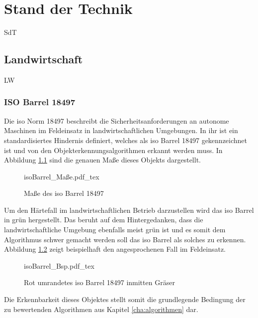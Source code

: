 \documentclass[12pt,
titlepage,
a4paper,
oneside,     %
openany,     %
listof=totoc,  %
numbers = noenddot, %
bibliography=totoc,    %
headsepline, %
]{scrbook} %
\begin{document}
\chapter{Stand der Technik}
\label{cha:sdT}

SdT

\section{Landwirtschaft}
\label{sec_landwirtschaft}

LW

\subsection{ISO Barrel 18497}
\label{subsec_iso}

Die \ac{iso} Norm 18497 beschreibt die Sicherheitsanforderungen an autonome Maschinen im Feldeinsatz in landwirtschaftlichen Umgebungen. In ihr ist ein standardisiertes Hindernis definiert, welches als \ac{iso} Barrel 18497 gekennzeichnet ist und von den Objekterkennungsalgorithmen erkannt werden muss. In Abbildung \ref{fig:isoBarrel} sind die genauen Maße dieses Objekts dargestellt. \\

\begin{figure}[h]
	\centering
	\def\svgwidth{0.6\columnwidth}
	{isoBarrel_Maße.pdf_tex}
	\caption{Maße des \ac{iso} Barrel 18497}
	\label{fig:isoBarrel}
\end{figure}

Um den Härtefall im landwirtschaftlichen Betrieb darzustellen wird das \ac{iso} Barrel in grün hergestellt. Das beruht auf dem Hintergedanken, dass die landwirtschaftliche Umgebung ebenfalls meist grün ist und es somit dem Algorithmus schwer gemacht werden soll das \ac{iso} Barrel als solches zu erkennen. Abbildung \ref{fig:isoBarrelBsp} zeigt beispielhaft den angesprochenen Fall im Feldeinsatz. \\

\begin{figure}[h]
	\centering
	\def\svgwidth{0.8\columnwidth}
	{isoBarrel_Bsp.pdf_tex}
	\caption{Rot umrandetes \ac{iso} Barrel 18497 inmitten Gräser}
	\label{fig:isoBarrelBsp}
\end{figure}

Die Erkennbarkeit dieses Objektes stellt somit die grundlegende Bedingung der zu bewertenden Algorithmen aus Kapitel \ref{cha:algorithmen} dar.
\end{document}
